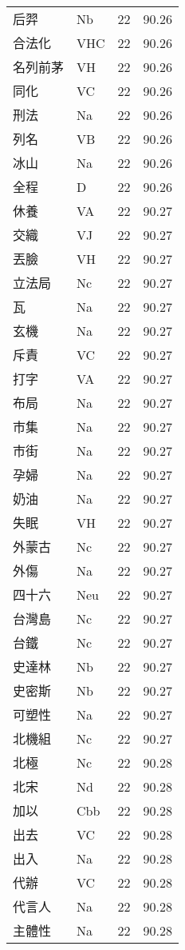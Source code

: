\documentclass[twocolumn]{book}
\begin{document}
\begin{supertabular}{llrr}
后羿 & Nb & 22 &  90.26\\
合法化 & VHC & 22 &  90.26\\
名列前茅 & VH & 22 &  90.26\\
同化 & VC & 22 &  90.26\\
刑法 & Na & 22 &  90.26\\
列名 & VB & 22 &  90.26\\
冰山 & Na & 22 &  90.26\\
全程 & D & 22 &  90.26\\
休養 & VA & 22 &  90.27\\
交織 & VJ & 22 &  90.27\\
丟臉 & VH & 22 &  90.27\\
立法局 & Nc & 22 &  90.27\\
瓦 & Na & 22 &  90.27\\
玄機 & Na & 22 &  90.27\\
斥責 & VC & 22 &  90.27\\
打字 & VA & 22 &  90.27\\
布局 & Na & 22 &  90.27\\
市集 & Na & 22 &  90.27\\
市街 & Na & 22 &  90.27\\
孕婦 & Na & 22 &  90.27\\
奶油 & Na & 22 &  90.27\\
失眠 & VH & 22 &  90.27\\
外蒙古 & Nc & 22 &  90.27\\
外傷 & Na & 22 &  90.27\\
四十六 & Neu & 22 &  90.27\\
台灣島 & Nc & 22 &  90.27\\
台鐵 & Nc & 22 &  90.27\\
史達林 & Nb & 22 &  90.27\\
史密斯 & Nb & 22 &  90.27\\
可塑性 & Na & 22 &  90.27\\
北機組 & Nc & 22 &  90.27\\
北極 & Nc & 22 &  90.28\\
北宋 & Nd & 22 &  90.28\\
加以 & Cbb & 22 &  90.28\\
出去 & VC & 22 &  90.28\\
出入 & Na & 22 &  90.28\\
代辦 & VC & 22 &  90.28\\
代言人 & Na & 22 &  90.28\\
主體性 & Na & 22 &  90.28\\

\end{supertabular}
\end{document}
